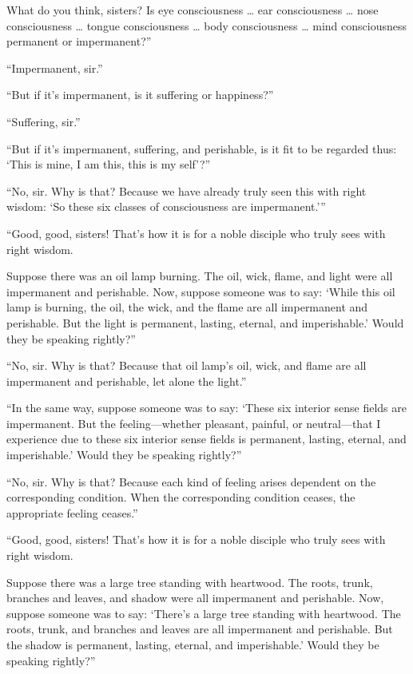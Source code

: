 \documentclass[12pt,openany]{book}%
\begin{document}
What do you think, sisters? Is eye consciousness … ear consciousness … nose consciousness … tongue consciousness … body consciousness … mind consciousness permanent or impermanent?” 

“Impermanent, sir.” 

“But if it’s impermanent, is it suffering or happiness?” 

“Suffering, sir.” 

“But if it’s impermanent, suffering, and perishable, is it fit to be regarded thus: ‘This is mine, I am this, this is my self’?” 

“No, sir. Why is that? Because we have already truly seen this with right wisdom: ‘So these six classes of consciousness are impermanent.’” 

“Good, good, sisters! That’s how it is for a noble disciple who truly sees with right wisdom. 

Suppose there was an oil lamp burning. The oil, wick, flame, and light were all impermanent and perishable. Now, suppose someone was to say: ‘While this oil lamp is burning, the oil, the wick, and the flame are all impermanent and perishable. But the light is permanent, lasting, eternal, and imperishable.’ Would they be speaking rightly?” 

“No, sir. Why is that? Because that oil lamp’s oil, wick, and flame are all impermanent and perishable, let alone the light.” 

“In the same way, suppose someone was to say: ‘These six interior sense fields are impermanent. But the feeling—whether pleasant, painful, or neutral—that I experience due to these six interior sense fields is permanent, lasting, eternal, and imperishable.’ Would they be speaking rightly?” 

“No, sir. Why is that? Because each kind of feeling arises dependent on the corresponding condition. When the corresponding condition ceases, the appropriate feeling ceases.” 

“Good, good, sisters! That’s how it is for a noble disciple who truly sees with right wisdom. 

Suppose there was a large tree standing with heartwood. The roots, trunk, branches and leaves, and shadow were all impermanent and perishable. Now, suppose someone was to say: ‘There’s a large tree standing with heartwood. The roots, trunk, and branches and leaves are all impermanent and perishable. But the shadow is permanent, lasting, eternal, and imperishable.’ Would they be speaking rightly?” 
\end{document}
